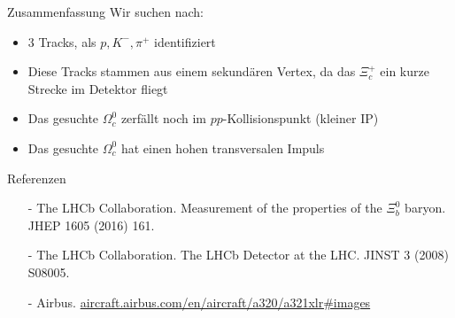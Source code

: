 \begin{frame}{Zusammenfassung}
Wir suchen nach:
\begin{spacing}{1.5}
\begin{itemize}
    \item 3 Tracks, als $p, K^-, \pi^+$ identifiziert
    \item Diese Tracks stammen aus einem sekundären Vertex, da das $\Xi_c^+$ ein kurze Strecke im Detektor fliegt
    \item Das gesuchte $\Omega_c^0$ zerfällt noch im $pp$-Kollisionspunkt (kleiner IP)
    \item Das gesuchte $\Omega_c^0$ hat einen hohen transversalen Impuls
\end{itemize}
\end{spacing}
\end{frame}
\begin{frame}{Referenzen} \footnotesize

    \begin{itemize}
\item[-] The LHCb Collaboration. Measurement of the properties of the $\Xi_b^0$ baryon. 	JHEP 1605 (2016) 161.
\item[-] The LHCb Collaboration. The LHCb Detector at the LHC.  JINST 3 (2008) S08005.
\item[-] Airbus. \url{aircraft.airbus.com/en/aircraft/a320/a321xlr#images}
\end{itemize}


\end{frame}


